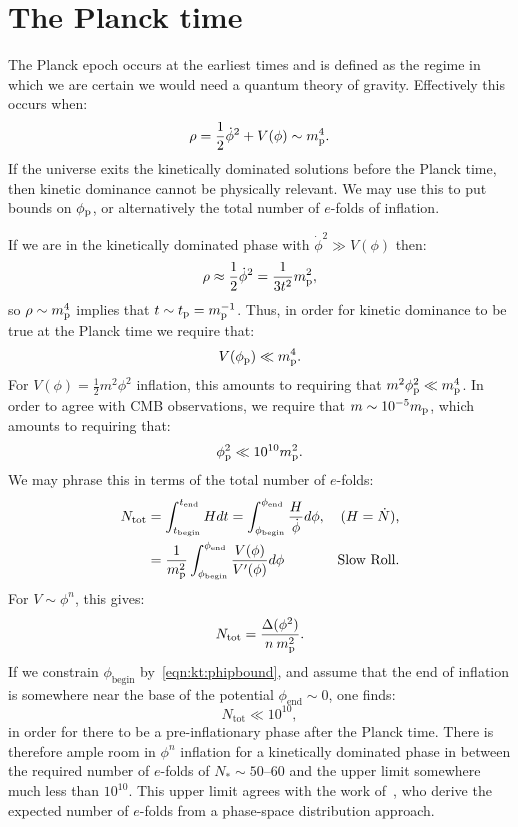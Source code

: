 \section{The Planck time}
The Planck epoch occurs at the earliest times and is defined as the
regime in which we are certain we would need a quantum theory of
gravity. Effectively this occurs when:
\begin{equation}
  \rho = \frac{1}{2}\dot\phi^2 + V(\phi)  \sim m_{\mathrm{p}}^4.
  \label{eqn:kt:rhosim}
\end{equation}
If the universe exits the kinetically dominated solutions before the
Planck time, then kinetic dominance cannot be physically relevant. We
may use this to put bounds on \(\phi_{\mathrm{p}}\), or alternatively the total
number of \(e\)-folds of inflation.

If we are in the kinetically dominated phase with \(\dot{\phi}^2\gg
V(\phi)\) then:
\begin{equation}
  \rho \approx \frac{1}{2}\dot\phi^2= \frac{1}{3t^2}m_{\mathrm{p}}^2 ,
  \label{eqn:kt:rhop}
\end{equation}
so \(\rho\sim m_{\mathrm{p}}^4\) implies that \(t\sim t_{\mathrm{p}}=m_{\mathrm{p}}^{-1}\). Thus, in order for
kinetic dominance to be true at the Planck time we require that:
\begin{equation}
  V(\phi_{\mathrm{p}}) \ll m_{\mathrm{p}}^4.
\end{equation}
For \(V(\phi) = \frac{1}{2}m^2\phi^2\) inflation, this amounts to requiring that \(m^2\phi_{\mathrm{p}}^2\ll m_{\mathrm{p}}^4\). In order to agree with CMB observations, we require
that \(m\sim10^{-5}m_{\mathrm{p}}\), which amounts to requiring that:
\begin{equation}
 \phi_{\mathrm{p}}^2 \ll 10^{10}m_{\mathrm{p}}^2.
 \label{eqn:kt:phipbound}
\end{equation}
We may phrase this in terms of the total number of \(e\)-folds:
\begin{align}
  N_\mathrm{tot} 
  &=\int_{t_\mathrm{begin}}^{t_\mathrm{end}} H dt 
  =\int_{\phi_\mathrm{begin}}^{\phi_\mathrm{end}} 
       \frac{H}{\dot{\phi}}d\phi,  &\text{(\(H=\dot{N}\)),}
  \\
  &=\frac{1}{m_{\mathrm{p}}^2}\int_{\phi_\mathrm{begin}}^{\phi_\mathrm{end}}
     {\frac{V(\phi)}{V^\prime(\phi)}}d\phi &\text{Slow Roll.}
\end{align}
For \(V\sim\phi^n\), this gives:
\begin{equation}
  N_\mathrm{tot} = \frac{\Delta (\phi^2) }{n\:m_{\mathrm{p}}^2}.
\end{equation}
If we constrain \(\phi_\mathrm{begin}\) by~\eqref{eqn:kt:phipbound}, and assume that the end of inflation  is somewhere near the base of the potential \(\phi_\mathrm{end}\sim0\), one finds: 
\begin{equation}
  N_\mathrm{tot}\ll 10^{10},
\end{equation}
in order for there to be a pre-inflationary phase after the Planck time.
There is therefore ample room in $\phi^n$ inflation for a kinetically dominated phase in between the required number of \(e\)-folds of \(N_*\sim50\)--\(60\) and the upper limit somewhere much less than $10^{10}$. This upper limit agrees with the work of~\cite{how_many_e_folds}, who derive the expected number of \(e\)-folds from a phase-space distribution approach.

